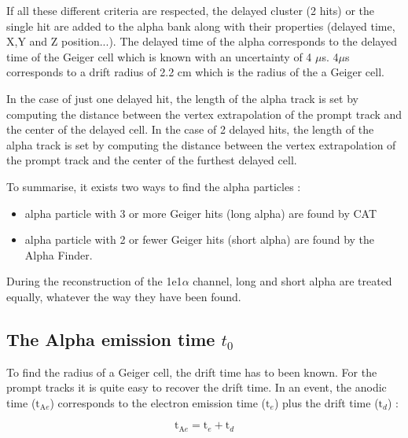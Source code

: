 \documentclass[main.tex]{subfiles}
\begin{document}
\noindent If all these different criteria are respected, the delayed cluster (2 hits) or the single hit are added to the alpha bank along with their properties (delayed time, X,Y and Z position...). The delayed time of the alpha corresponds to the delayed time of the Geiger cell which is known with an uncertainty of 4 $\mu$s. 4$\mu$s corresponds to a drift radius of 2.2 cm which is the radius of the a Geiger cell. 


\bigskip


\noindent In the case of just one delayed hit, the length of the alpha track is set by computing the distance between the vertex extrapolation of the prompt track and the center of the delayed cell. In the case of 2 delayed hits, the length of the alpha track is set by computing the distance between the vertex extrapolation of the prompt track and the center of the furthest delayed cell.


\bigskip


\NI To summarise, it exists two ways to find the alpha particles :



\begin{itemize}
\item alpha particle with 3 or more Geiger hits (long alpha)  are found by CAT
\item alpha particle with 2 or fewer Geiger hits (short alpha) are found by the Alpha Finder.
\end{itemize} 


\noindent During the reconstruction of the 1e1$\alpha$ channel, long and short alpha are treated equally, whatever the way they have been found.

  
\subsection{The Alpha emission time $t_0$}


To find the radius of a Geiger cell, the drift time has to been known. For the prompt tracks it is quite easy to recover the drift time. In an event, the anodic time ($\text{t}_{\text{A}e}$) corresponds to the electron emission time ($ \text{t}_e$) plus the drift time ($\text{t}_d$) :


$$\text{t}_{\text{A}e} = \text{t}_e + \text{t}_d$$
\end{document}
